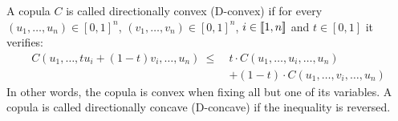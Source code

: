 \begin{definition}\label{def:convex}
    A copula $C$ is called directionally convex (D-convex) \cite{alvoni_dierent_2007} if for every $(u_1,\dots,u_n)\in[0,1]^n$, $(v_1, \dots, v_n)\in[0,1]^n$, $i\in{[\![}1,n{]\!]}$ and $t\in[0,1]$ it verifies:
    \begin{align}
        C(u_1,\dots, tu_i+(1-t)v_i,\dots, u_n) ~\leqslant~&t\cdot C(u_1,\dots, u_i,\dots, u_n)\nonumber\\
        &+ (1-t)\cdot C(u_1,\dots, v_i,\dots, u_n)\label{eq:convex_copula}
    \end{align}
    In other words, the copula is convex when fixing all but one of its variables. A copula is called directionally concave (D-concave) if the inequality is reversed.
\end{definition}

